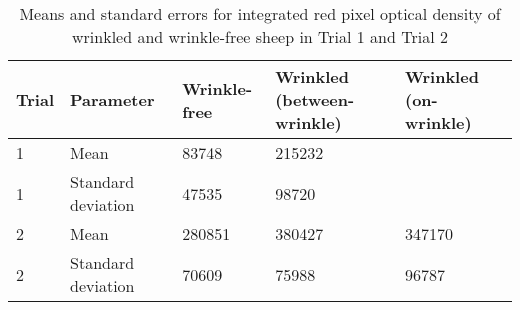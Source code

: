 %

\begin{table}[htp]
\centering
\caption{Means and standard errors for integrated red pixel optical density of wrinkled and wrinkle-free sheep in Trial 1 and Trial 2}
\label{tab:redpixelodmeans}
\vspace{0.1in}
\begin{tabular}{|p{0.5in}|p{0.6in}|p{1.0in}|p{1.0in}|p{1.0in}|}  \hline
     Trial & Parameter &  Wrinkle-free  &  Wrinkled (between-wrinkle) & Wrinkled (on-wrinkle)  \\ 
\hline
  1  & Mean &   83748        &   215232   &       \\
  1  & Standard deviation &   47535      &    98720   &  \\ \hline
  2  & Mean &   280851       &   380427    &  347170   \\ 
  2  & Standard deviation &    70609     &  75988  &  96787 \\ \hline
\end{tabular}
\end{table}

%
